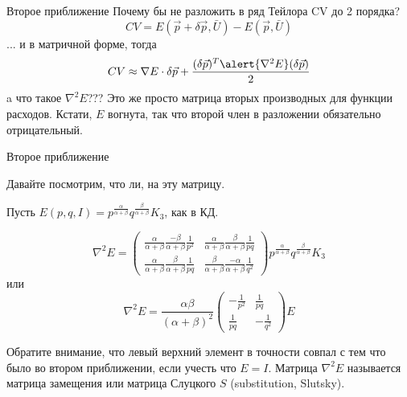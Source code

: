 \documentclass{beamer}
\begin{document}
\begin{frame}{Второе приближение}
Почему бы не разложить в ряд Тейлора CV до 2 порядка?
$$ CV = E(\vec p +  \delta \vec p, \bar U) - E(\vec p, \bar U)$$ 
... и в матричной форме, тогда
$$ CV \approx \nabla E \cdot  \delta \vec p + \frac{( \delta \vec p)^T \alert{\nabla^2 E}  (\delta \vec p)}{2}$$ 
a что такое $\nabla^2 E$??? Это же просто матрица вторых производных для функции расходов. Кстати, $E$ вогнута, так что второй член в разложении обязательно отрицательный.
\end{frame}

\begin{frame}{Второе приближение}

Давайте посмотрим, что ли, на эту матрицу. 

Пусть $E(p,q,I) = p^{\frac{\alpha}{\alpha+\beta}}q^{\frac{\beta}{\alpha+\beta}}K_3$, как в КД.

$$\nabla^2 E = \begin{pmatrix}
  \frac{\alpha}{\alpha + \beta}\frac{-\beta}{\alpha + \beta}\frac{1}{p^2}& \frac{\alpha}{\alpha + \beta}\frac{\beta}{\alpha + \beta}\frac{1}{pq}\\
  \frac{\alpha}{\alpha + \beta}\frac{\beta}{\alpha + \beta}\frac{1}{pq} & \frac{\beta}{\alpha + \beta}\frac{-\alpha}{\alpha + \beta}\frac{1}{q^2}
\end{pmatrix}p^{\frac{\alpha}{\alpha+\beta}}q^{\frac{\beta}{\alpha+\beta}}K_3$$
или
$$\nabla^2 E = \frac{\alpha\beta}{(\alpha + \beta)^2}\begin{pmatrix}
  -\frac{1}{p^2}& \frac{1}{pq}\\
  \frac{1}{pq} & -\frac{1}{q^2}
\end{pmatrix}E$$

Обратите внимание, что левый верхний элемент в точности совпал с тем что было во втором приближении, если учесть что $E = I$. Матрица $\nabla^2 E$ называется \alert{матрица замещения} или \alert{матрица Слуцкого} $S$ (substitution, Slutsky).

\end{frame}
\end{document}
